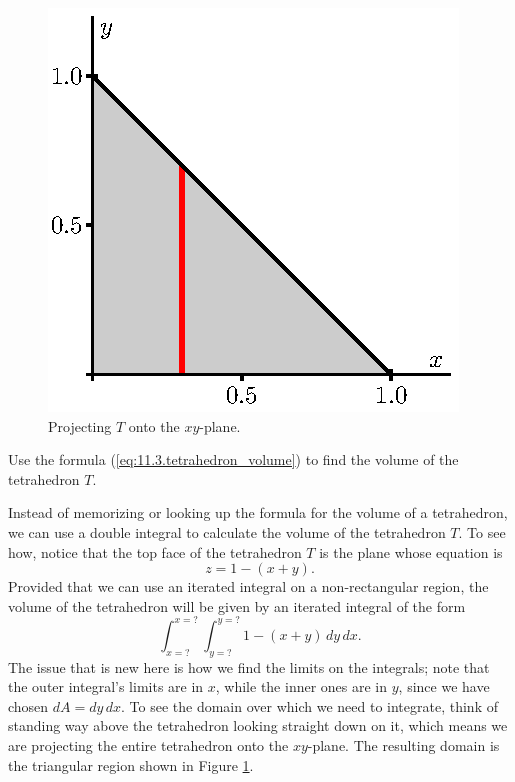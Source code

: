 \begin{pa}
\begin{figure}[h]
\begin{center}
\begin{minipage}{2.5in}
\begin{center}
  \includegraphics{figures/fig_11_3_tetra_project.eps}
\end{center}
\caption{Projecting $T$ onto the $xy$-plane.}
\label{F:11.3.Tetrahedron_proj_PA}
\end{minipage}
\end{center}
\end{figure}
    \ba
    \item Use the formula (\ref{eq:11.3.tetrahedron_volume}) to find the volume of the tetrahedron $T$.
    
    \item Instead of memorizing or looking up the formula for the volume of a tetrahedron, we can use a double integral to calculate the volume of the tetrahedron $T$. To see how, notice that the top face of the tetrahedron $T$ is the plane whose equation is
        \[z = 1-(x+y).\]
        Provided that we can use an iterated integral on a non-rectangular region, the volume of the tetrahedron will be given by an iterated integral of the form
        \[\int_{x=?}^{x=?} \int_{y=?}^{y=?} 1-(x+y) \, dy \, dx.\]
        The issue that is new here is how we find the limits on the integrals; note that the outer integral's limits are in $x$, while the inner ones are in $y$, since we have chosen $dA = dy \, dx$. To see the domain over which we need to integrate, think of standing way above the tetrahedron looking straight down on it, which means we are projecting the entire tetrahedron onto the $xy$-plane. The resulting domain is the triangular region shown in Figure \ref{F:11.3.Tetrahedron_proj_PA}. \\


\end{pa}
